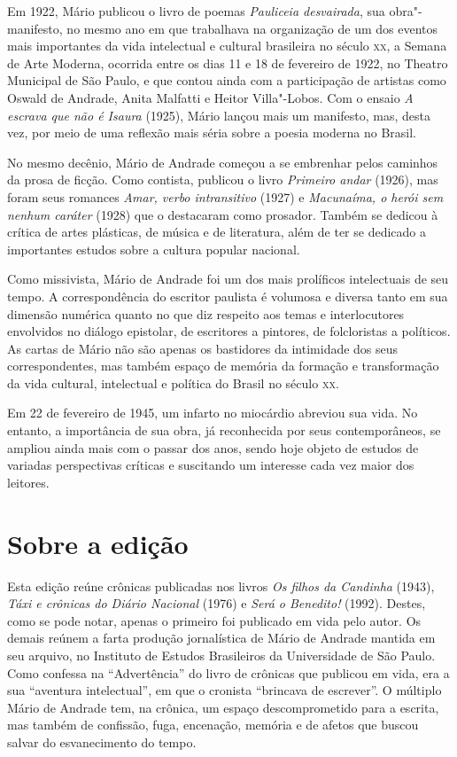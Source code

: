 Em 1922, Mário publicou o livro de poemas \emph{Pauliceia desvairada},
sua obra"-manifesto, no mesmo ano em que trabalhava na organização de um
dos eventos mais importantes da vida intelectual e cultural brasileira
no século \textsc{xx}, a Semana de Arte Moderna, ocorrida entre os dias 11 e 18
de fevereiro de 1922, no Theatro Municipal de São Paulo, e que contou
ainda com a participação de artistas como Oswald de Andrade, Anita
Malfatti e Heitor Villa"-Lobos. Com o ensaio \emph{A escrava que não é
Isaura} (1925), Mário lançou mais um manifesto, mas, desta vez, por meio
de uma reflexão mais séria sobre a poesia moderna no Brasil.

No mesmo decênio, Mário de Andrade começou a se embrenhar pelos caminhos
da prosa de ficção. Como contista, publicou o livro \emph{Primeiro
andar} (1926), mas foram seus romances \emph{Amar, verbo intransitivo}
(1927) e \emph{Macunaíma, o herói sem nenhum caráter} (1928) que o
destacaram como prosador. Também se dedicou à crítica de artes
plásticas, de música e de literatura, além de ter se dedicado a
importantes estudos sobre a cultura popular nacional.

Como missivista, Mário de Andrade foi um dos mais prolíficos
intelectuais de seu tempo. A correspondência do escritor paulista é
volumosa e diversa tanto em sua dimensão numérica quanto no que diz
respeito aos temas e interlocutores envolvidos no diálogo epistolar, de
escritores a pintores, de folcloristas a políticos. As cartas de Mário
não são apenas os bastidores da intimidade dos seus correspondentes, mas
também espaço de memória da formação e transformação da vida cultural,
intelectual e política do Brasil no século \textsc{xx}.

Em 22 de fevereiro de 1945, um infarto no miocárdio abreviou sua vida.
No entanto, a importância de sua obra, já reconhecida por seus
contemporâneos, se ampliou ainda mais com o passar dos anos, sendo hoje
objeto de estudos de variadas perspectivas críticas e suscitando um
interesse cada vez maior dos leitores.

\chapter{Sobre a edição}

Esta edição reúne crônicas publicadas nos livros \emph{Os filhos da
Candinha} (1943), \emph{Táxi e crônicas do Diário Nacional} (1976) e
\emph{Será o Benedito!} (1992). Destes, como se pode notar, apenas o
primeiro foi publicado em vida pelo autor. Os demais reúnem a farta
produção jornalística de Mário de Andrade mantida em seu arquivo, no
Instituto de Estudos Brasileiros da Universidade de São Paulo. Como
confessa na ``Advertência'' do livro de crônicas que publicou em vida,
era a sua ``aventura intelectual'', em que o cronista ``brincava de
escrever''. O múltiplo Mário de Andrade tem, na crônica, um espaço
descomprometido para a escrita, mas também de confissão, fuga,
encenação, memória e de afetos que buscou salvar do esvanecimento do
tempo.

